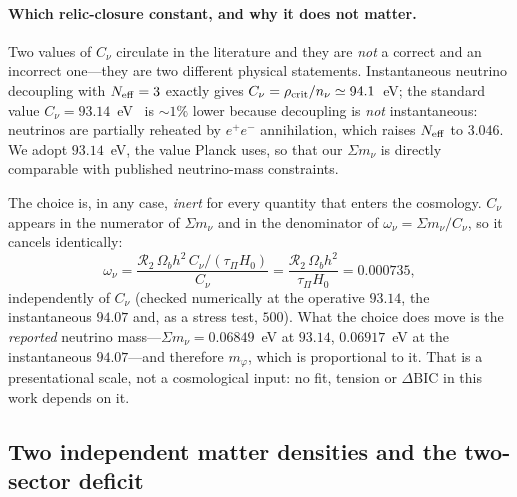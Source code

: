 \documentclass[12pt,a4paper]{article}
\begin{document}
\paragraph{Which relic-closure constant, and why it does not matter.} Two values
of $C_\nu$ circulate in the literature and they are \emph{not} a correct and an
incorrect one---they are two different physical statements. Instantaneous
neutrino decoupling with $N_{\rm eff}=3$ exactly gives
$C_\nu=\rho_{\rm crit}/n_\nu\simeq94.1$~eV; the standard value
$C_\nu=93.14$~eV~\citep{Mangano2005} is ${\sim}1\%$ lower because decoupling is
\emph{not} instantaneous: neutrinos are partially reheated by $e^+e^-$
annihilation, which raises $N_{\rm eff}$ to $3.046$. We adopt $93.14$~eV, the
value Planck uses, so that our $\Sigma m_\nu$ is directly comparable with
published neutrino-mass constraints.

The choice is, in any case, \emph{inert} for every quantity that enters the
cosmology. $C_\nu$ appears in the numerator of $\Sigma m_\nu$ and in the
denominator of $\omega_\nu=\Sigma m_\nu/C_\nu$, so it cancels identically:
\begin{equation}
  \label{eq:cnu-cancels}
  \omega_\nu = \frac{\mathcal{R}_2\,\Omega_b h^2\,C_\nu/(\tau_\Pi H_0)}{C_\nu}
             = \frac{\mathcal{R}_2\,\Omega_b h^2}{\tau_\Pi H_0}
             = 0.000735 ,
\end{equation}
independently of $C_\nu$ (checked numerically at the operative $93.14$, the
instantaneous $94.07$ and, as a
stress test, $500$). What the choice does move is the \emph{reported} neutrino
mass---$\Sigma m_\nu=0.06849$~eV at $93.14$, $0.06917$~eV at the instantaneous
$94.07$---and
therefore $m_\varphi$, which is proportional to it. That is a presentational
scale, not a cosmological input: no fit, tension or $\Delta\mathrm{BIC}$ in this
work depends on it.

\subsection{Two independent matter densities and the two-sector deficit}
\label{subsec:mira}
\end{document}

